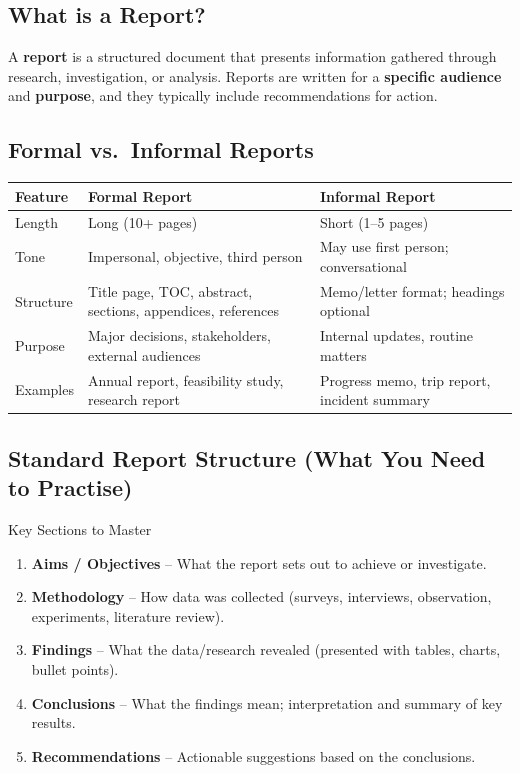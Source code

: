 \documentclass[12pt,a4paper]{article}
\begin{document}
\subsection{What is a Report?}

A \textbf{report} is a structured document that presents information gathered through research, investigation, or analysis. Reports are written for a \textbf{specific audience} and \textbf{purpose}, and they typically include recommendations for action.

\subsection{Formal vs.\ Informal Reports}

\begin{center}
\begin{tabular}{p{2.5cm}p{5.5cm}p{5.5cm}}
\toprule
\textbf{Feature} & \textbf{Formal Report} & \textbf{Informal Report} \\
\midrule
Length & Long (10+ pages) & Short (1--5 pages) \\
\addlinespace
Tone & Impersonal, objective, third person & May use first person; conversational \\
\addlinespace
Structure & Title page, TOC, abstract, sections, appendices, references & Memo/letter format; headings optional \\
\addlinespace
Purpose & Major decisions, stakeholders, external audiences & Internal updates, routine matters \\
\addlinespace
Examples & Annual report, feasibility study, research report & Progress memo, trip report, incident summary \\
\bottomrule
\end{tabular}
\end{center}

\subsection{Standard Report Structure (What You Need to Practise)}

\begin{keybox}{Key Sections to Master}
\begin{enumerate}
    \item \textbf{Aims / Objectives} -- What the report sets out to achieve or investigate.
    \item \textbf{Methodology} -- How data was collected (surveys, interviews, observation, experiments, literature review).
    \item \textbf{Findings} -- What the data/research revealed (presented with tables, charts, bullet points).
    \item \textbf{Conclusions} -- What the findings mean; interpretation and summary of key results.
    \item \textbf{Recommendations} -- Actionable suggestions based on the conclusions.
\end{enumerate}
\end{keybox}
\end{document}
